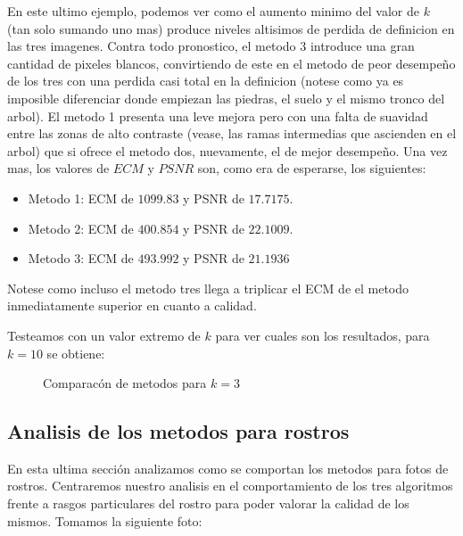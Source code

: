 En este ultimo ejemplo, podemos ver como el aumento minimo del valor de $k$ (tan solo sumando uno mas) produce niveles altisimos de perdida de definicion en las tres imagenes. Contra todo pronostico, el metodo 3 introduce una gran cantidad de pixeles blancos, convirtiendo de este en el metodo de peor desempeño de los tres con una perdida casi total en la definicion (notese como ya es imposible diferenciar donde empiezan las piedras, el suelo y el mismo tronco del arbol). El metodo 1 presenta una leve mejora pero con una falta de suavidad entre las zonas de alto contraste (vease, las ramas intermedias que ascienden en el arbol) que si ofrece el metodo dos, nuevamente, el de mejor desempeño.
Una vez mas, los valores de $ECM$ y $PSNR$ son, como era de esperarse, los siguientes:
\begin{itemize}
 \item Metodo 1: ECM de $1099.83$ y PSNR de $17.7175$.
 \item Metodo 2: ECM de $400.854$ y PSNR de $22.1009$.
 \item Metodo 3: ECM de $493.992$ y PSNR de $21.1936$
\end{itemize}
Notese como incluso el metodo tres llega a triplicar el ECM de el metodo inmediatamente superior en cuanto a calidad.

Testeamos con un valor extremo de $k$ para ver cuales son los resultados, para $k=10$ se obtiene:

\begin{figure}[H]
    \centering
    \qquad
    \qquad
    \caption{Comparacón de metodos para $k = 3$}%
    \label{fig:example}%
\end{figure}



\subsection{Analisis de los metodos para rostros}

En esta ultima sección analizamos como se comportan los metodos para fotos de rostros. Centraremos nuestro analisis en el comportamiento de los tres algoritmos frente a rasgos particulares del rostro para poder valorar la calidad de los mismos. Tomamos la siguiente foto:

